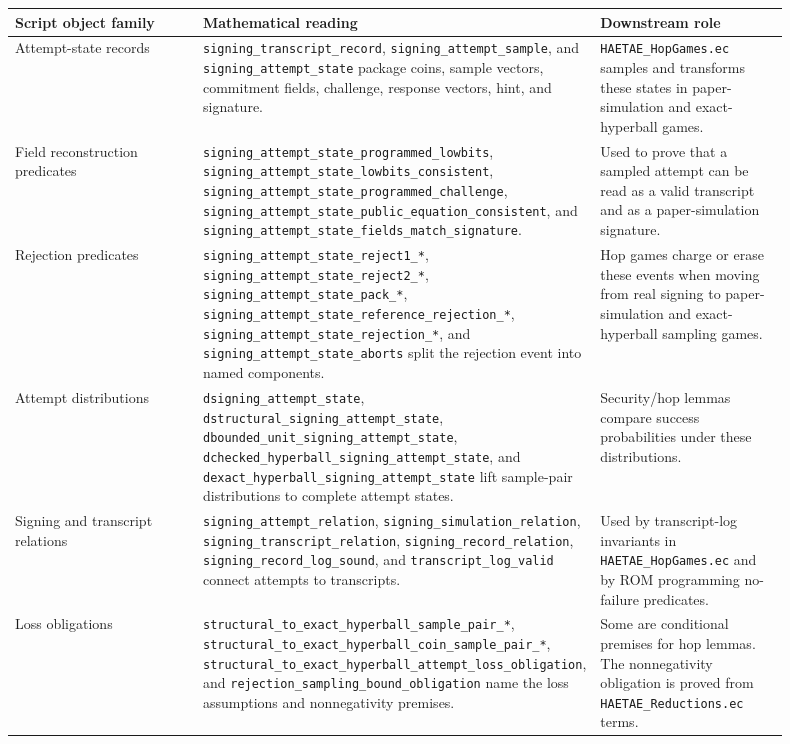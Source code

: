 \documentclass[11pt]{report}
\DeclareRobustCommand{\file}[1]{\ifmmode\text{\nolinkurl{#1}}\else\nolinkurl{#1}\fi}
\DeclareRobustCommand{\ec}[1]{\ifmmode\text{\nolinkurl{#1}}\else\nolinkurl{#1}\fi}
\theoremstyle{definition}
\theoremstyle{plain}
\begin{document}
\begin{longtable}{p{0.26\linewidth}p{0.39\linewidth}p{0.25\linewidth}}
\toprule
\textbf{Script object family} & \textbf{Mathematical reading} & \textbf{Downstream role} \\
\midrule
Attempt-state records &
\ec{signing\_transcript\_record}, \ec{signing\_attempt\_sample}, and
\ec{signing\_attempt\_state} package coins, sample vectors, commitment
fields, challenge, response vectors, hint, and signature. &
\file{HAETAE\_HopGames.ec} samples and transforms these states in
paper-simulation and exact-hyperball games. \\
\midrule
Field reconstruction predicates &
\ec{signing\_attempt\_state\_programmed\_lowbits},
\ec{signing\_attempt\_state\_lowbits\_consistent},
\ec{signing\_attempt\_state\_programmed\_challenge},
\ec{signing\_attempt\_state\_public\_equation\_consistent}, and
\ec{signing\_attempt\_state\_fields\_match\_signature}. &
Used to prove that a sampled attempt can be read as a valid transcript and as
a paper-simulation signature. \\
\midrule
Rejection predicates &
\ec{signing\_attempt\_state\_reject1\_*},
\ec{signing\_attempt\_state\_reject2\_*},
\ec{signing\_attempt\_state\_pack\_*},
\ec{signing\_attempt\_state\_reference\_rejection\_*},
\ec{signing\_attempt\_state\_rejection\_*}, and
\ec{signing\_attempt\_state\_aborts} split the rejection event into named
components. &
Hop games charge or erase these events when moving from real signing to
paper-simulation and exact-hyperball sampling games. \\
\midrule
Attempt distributions &
\ec{dsigning\_attempt\_state},
\ec{dstructural\_signing\_attempt\_state},
\ec{dbounded\_unit\_signing\_attempt\_state},
\ec{dchecked\_hyperball\_signing\_attempt\_state}, and
\ec{dexact\_hyperball\_signing\_attempt\_state} lift sample-pair
distributions to complete attempt states. &
Security/hop lemmas compare success probabilities under these distributions. \\
\midrule
Signing and transcript relations &
\ec{signing\_attempt\_relation}, \ec{signing\_simulation\_relation},
\ec{signing\_transcript\_relation}, \ec{signing\_record\_relation},
\ec{signing\_record\_log\_sound}, and \ec{transcript\_log\_valid} connect
attempts to transcripts. &
Used by transcript-log invariants in \file{HAETAE\_HopGames.ec} and by ROM
programming no-failure predicates. \\
\midrule
Loss obligations &
\ec{structural\_to\_exact\_hyperball\_sample\_pair\_*},
\ec{structural\_to\_exact\_hyperball\_coin\_sample\_pair\_*},
\ec{structural\_to\_exact\_hyperball\_attempt\_loss\_obligation}, and
\ec{rejection\_sampling\_bound\_obligation} name the loss assumptions and
nonnegativity premises. &
Some are conditional premises for hop lemmas.  The nonnegativity obligation is
proved from \file{HAETAE\_Reductions.ec} terms. \\
\bottomrule
\end{longtable}
\end{document}

